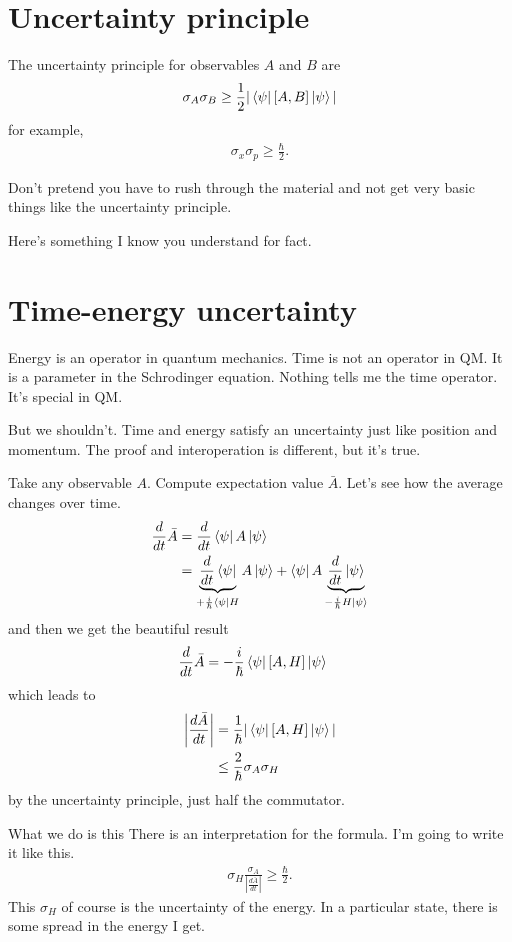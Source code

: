\section{Uncertainty principle}
The uncertainty principle for observables $A$ and $B$ are
\begin{align}
    \sigma_A \sigma_B \ge \frac{1}{2}
    |\bra{\psi} [A,B] \ket{\psi}|
\end{align}
for example,
\begin{align}
    \sigma_x \sigma_p \ge \frac{\hbar}{2}.
\end{align}

Don't pretend you have to rush through the material and not get very basic
things like the uncertainty principle.

Here's something I know you understand for fact.

\section{Time-energy uncertainty}
Energy is an operator in quantum mechanics.
Time is not an operator in QM.
It is a parameter in the Schrodinger equation.
Nothing tells me the time operator.
It's special in QM.

But we shouldn't.
Time and energy satisfy an uncertainty just like position and momentum.
The proof and interoperation is different,
but it's true.

Take any observable $A$.
Compute expectation value $\bar{A}$.
Let's see how the average changes over time.
\begin{align}
    \frac{d}{dt}\bar{A} &= \frac{d}{dt}\bra{\psi} A\ket{\psi}\\
    &= \underbrace{\frac{d}{dt} \bra{\psi}}_{+\frac{i}{\hbar}\bra{\psi} H}
    A \ket{\psi}
    + \bra{\psi} A
    \underbrace{\frac{d}{dt}\ket{\psi}}_{-\frac{i}{\hbar}H\ket{\psi}}
\end{align}
and then we get the beautiful result
\begin{align}
    \frac{d}{dt}\bar{A} &=
    -\frac{i}{\hbar} \bra{\psi} [A,H] \ket{\psi}
\end{align}
which leads to
\begin{align}
    \left|\frac{d\bar{A}}{dt}\right| &=
    \frac{1}{\hbar}
    |\bra{\psi} [A,H] \ket{\psi} |\\
    &\le \frac{2}{\hbar}\sigma_A \sigma_H
\end{align}
by the uncertainty principle,
just half the commutator.

What we do is this
There is an interpretation for the formula.
I'm going to write it like this.
\begin{align}
    \boxed{
        \sigma_H \frac{\sigma_A}{\left|\frac{d\bar{A}}{dt}\right|}
        \ge \frac{\hbar}{2}.
    }
\end{align}
This $\sigma_H$ of course is the uncertainty of the energy.
In a particular state,
there is some spread in the energy I get.

